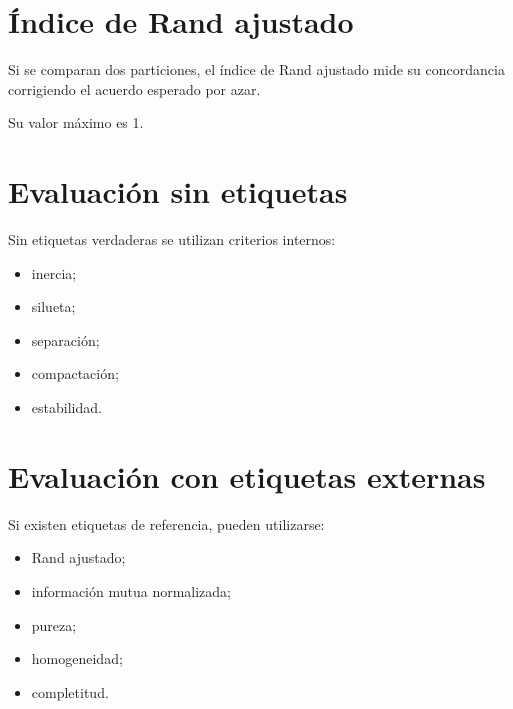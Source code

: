 \documentclass[
  spanish,
  10.5pt,
  letterpaper,
  DIV=11,
  numbers=noendperiod,
  oneside,
  open=any]{scrreprt}
\providecommand{\tightlist}{%
  \setlength{\itemsep}{0pt}\setlength{\parskip}{0pt}}
\theoremstyle{definition}
\theoremstyle{definition}
\theoremstyle{plain}
\theoremstyle{remark}
\begin{document}
\section*{Índice de Rand ajustado}\label{uxedndice-de-rand-ajustado}


Si se comparan dos particiones, el índice de Rand ajustado mide su
concordancia corrigiendo el acuerdo esperado por azar.

Su valor máximo es 1.

\section*{Evaluación sin etiquetas}\label{evaluaciuxf3n-sin-etiquetas}


Sin etiquetas verdaderas se utilizan criterios internos:

\begin{itemize}
\tightlist
\item
  inercia;
\item
  silueta;
\item
  separación;
\item
  compactación;
\item
  estabilidad.
\end{itemize}

\section*{Evaluación con etiquetas
externas}\label{evaluaciuxf3n-con-etiquetas-externas}


Si existen etiquetas de referencia, pueden utilizarse:

\begin{itemize}
\tightlist
\item
  Rand ajustado;
\item
  información mutua normalizada;
\item
  pureza;
\item
  homogeneidad;
\item
  completitud.
\end{itemize}
\end{document}
